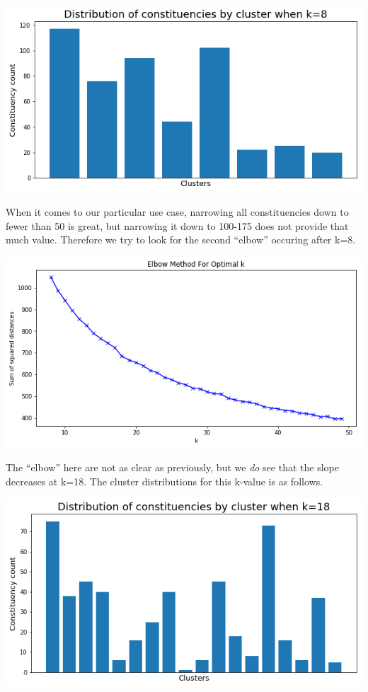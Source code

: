 \documentclass[a4paper, 11pt]{article}
\begin{document}
\begin{center}
  \includegraphics[scale=.4]{../gfx/cluster_dist0.png}
\end{center}

When it comes to our particular use case, narrowing all constituencies down to fewer than 50 is great, but narrowing it down to 100-175 does not provide that much value. Therefore we try to look for the second ``elbow'' occuring after k=8.

\begin{center}
  \includegraphics[scale=.5]{../gfx/elbow1.png}
\end{center}

The ``elbow'' here are not as clear as previously, but we \textit{do} see that the slope decreases at k=18. The cluster distributions for this k-value is as follows.

\begin{center}
  \includegraphics[scale=.4]{../gfx/cluster_dist1.png}
\end{center}
\end{document}
